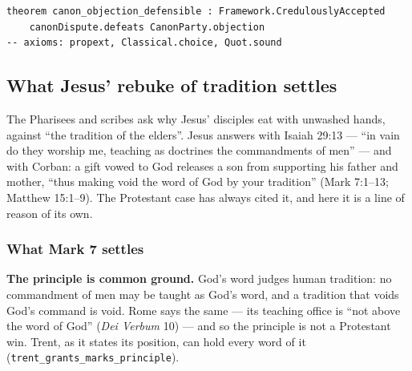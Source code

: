 \documentclass[11pt]{article}
\begin{document}
{\small\begin{verbatim}
theorem canon_objection_defensible : Framework.CredulouslyAccepted
    canonDispute.defeats CanonParty.objection
-- axioms: propext, Classical.choice, Quot.sound
\end{verbatim}}
\subsection*{What Jesus’ rebuke of tradition settles}
The Pharisees and scribes ask why Jesus’ disciples eat with unwashed hands, against “the tradition of the elders”. Jesus answers with Isaiah 29:13 — “in vain do they worship me, teaching as doctrines the commandments of men” — and with Corban: a gift vowed to God releases a son from supporting his father and mother, “thus making void the word of God by your tradition” (Mark 7:1–13; Matthew 15:1–9). The Protestant case has always cited it, and here it is a line of reason of its own.

\subsubsection*{What Mark 7 settles}
\textbf{The principle is common ground.} God’s word judges human tradition: no commandment of men may be taught as God’s word, and a tradition that voids God’s command is void. Rome says the same — its teaching office is “not above the word of God” (\emph{Dei Verbum} 10) — and so the principle is not a Protestant win. Trent, as it states its position, can hold every word of it (\texttt{trent\_\allowbreak{}grants\_\allowbreak{}marks\_\allowbreak{}principle}).
\end{document}
